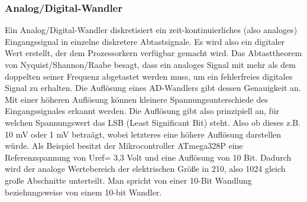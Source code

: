 \subsubsection{Analog/Digital-Wandler} \label{grund-ad-wandler-subsubsec}


Ein Analog/Digital-Wandler diskretisiert ein zeit-kontinuierliches (also analoges) Eingangssignal in einzelne diskretere Abtastsignale. Es wird also ein digitaler Wert erstellt, der dem Prozessorkern verfügbar gemacht wird. Das Abtasttheorem von Nyquist/Shannon/Raabe besagt, dass ein analoges Signal mit mehr als dem doppelten seiner Frequenz abgetastet werden muss, um ein fehlerfreies digitales Signal zu erhalten. Die Auflösung eines AD-Wandlers gibt dessen Genauigkeit an. Mit einer höheren Auflösung können kleinere Spannungsunterschiede des Eingangssignales erkannt werden. Die Auflösung gibt also prinzipiell an, für welchen Spannungswert das LSB (Least Significant Bit) steht. Also ob dieses z.B. 10 mV oder 1 mV betraägt, wobei letzteres eine höhere Auflösung darstellen würde. Als Beispiel besitzt der Mikrocontroller ATmega328P eine Referenzspannung von Uref= 3,3 Volt und eine Auflösung von 10 Bit. Dadurch wird der analoge Wertebereich der elektrischen Größe in 210, also 1024 gleich große Abschnitte unterteilt. Man spricht von einer 10-Bit Wandlung beziehungsweise von einem 10-bit Wandler. 
